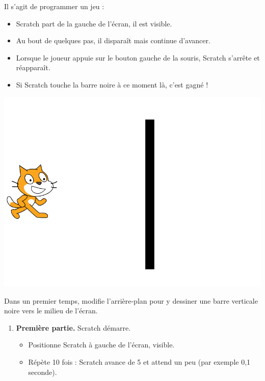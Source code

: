 \documentclass[class=report,crop=false, 12pt]{standalone}
\begin{document}
\begin{activite}

Il s'agit de programmer un jeu : 
\begin{itemize}
  \item Scratch part de la gauche de l'écran, il est visible.
  \item Au bout de quelques pas, il disparaît mais continue d'avancer. 
  \item Lorsque le joueur appuie sur le bouton gauche de la souris, Scratch s'arrête et réapparaît.
  \item Si Scratch touche la barre noire à ce moment là, c'est gagné !
\end{itemize}

\begin{center}
  \includegraphics[scale=\scaleecran]{ecran-04-ex3} 
\end{center}

Dans un premier temps, modifie l'arrière-plan pour y dessiner une barre verticale noire vers le milieu de l'écran.

\begin{enumerate}
  \item \textbf{Première partie.} Scratch démarre.
  
  \begin{itemize}
    \item Positionne Scratch à gauche de l'écran, visible.
    \item Répète 10 fois : Scratch avance de 5 et attend un peu (par exemple 0,1 seconde). 
  \end{itemize}
  

\end{enumerate}
\end{activite}
\end{document}
